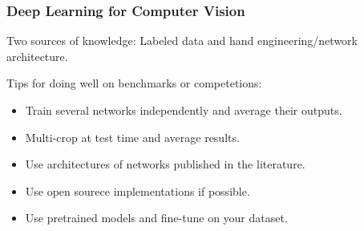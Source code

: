 \documentclass{article}
\begin{document}
		\subsubsection{Deep Learning for Computer Vision}
			\begin{flushleft}
				Two sources of knowledge: Labeled data and hand engineering/network architecture.
			\end{flushleft}
			\begin{flushleft}
				Tips for doing well on benchmarks or competetions:
				\begin{itemize}
					\item Train several networks independently and average their outputs.
					\item Multi-crop at test time and average results.
					\item Use architectures of networks published in the literature.
					\item Use open sourece implementations if possible.
					\item Use pretrained models and fine-tune on your dataset.
				\end{itemize}
			\end{flushleft}
\end{document}
